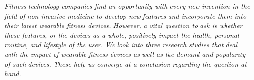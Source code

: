 \small
\vspace{-0.25cm}
\vspace{-0.25cm}

\noindent \emph{\justifying
Fitness technology companies find an opportunity with every new invention in the field of non-invasive medicine to develop new features and incorporate them into their latest wearable fitness devices. However, a vital question to ask is whether these features, or the devices as a whole, positively impact the health, personal routine, and lifestyle of the user. We look into three research studies that deal with the impact of wearable fitness devices as well as the demand and popularity of such devices. These help us converge at a conclusion regarding the question at hand.
}